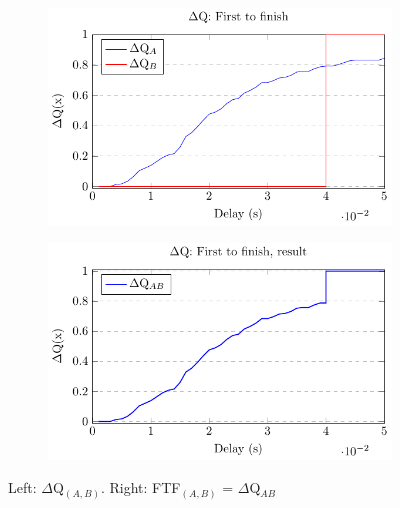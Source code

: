        \begin{figure}[H]
            \centering
            \begin{subfigure}{.5\textwidth}
                \centering
                \includegraphics[scale = 0.7]{tikz/ftf_1.pdf}
                \label{fig:ftf1}
            \end{subfigure}%
            \begin{subfigure}{.5\textwidth}
                \centering
                \includegraphics[scale = 0.7]{tikz/ftf_2.pdf}
                \label{fig:ftf2}
            \end{subfigure}
            \caption{Left: $\Delta$Q$_{(A, B)}$. Right: FTF$_{(A, B)}$ = $\Delta$Q$_{AB}$}%
            \label{fig:ftf}
            \end{figure}

